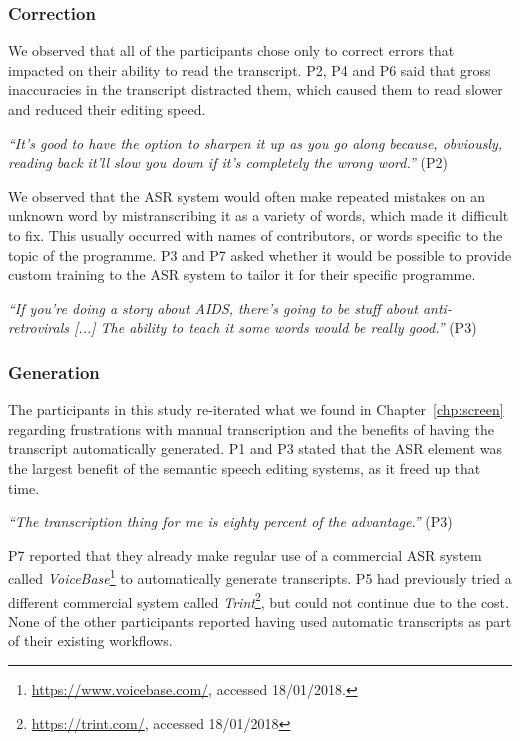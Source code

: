 \subsubsection{Correction}

We observed that all of the participants chose only to correct errors that impacted on their ability to
read the transcript.  P2, P4 and P6 said that gross inaccuracies in the transcript distracted them, which caused them
to read slower and reduced their editing speed.

\textit{``It's good to have the option to sharpen it up as you go along because, obviously, reading back it'll slow
you down if it's completely the wrong word.''} (P2)


We observed that the ASR system would often make repeated mistakes on an unknown word by mistranscribing it
as a variety of words, which made it difficult to fix.  This usually occurred with names of contributors, or words
specific to the topic of the programme.  P3 and P7 asked whether it would be possible to provide custom training to the
ASR system to tailor it for their specific programme.

\textit{``If you're doing a story about AIDS, there's going to be stuff about anti-retrovirals [...]
The ability to teach it some words would be really good.''} (P3)


\subsubsection{Generation}

The participants in this study re-iterated what we found in Chapter~\ref{chp:screen} regarding frustrations with manual
transcription and the benefits of having the transcript automatically generated.
P1 and P3 stated that the ASR element was the largest benefit of the semantic speech editing systems, as it
freed up that time.

\textit{``The transcription thing for me is eighty percent of the advantage.''} (P3)

P7 reported that they already make regular use of a commercial ASR system called
\textit{VoiceBase}\footnote{\url{https://www.voicebase.com/}, accessed 18/01/2018.} to automatically generate
transcripts.  P5 had previously tried a different commercial system called
\textit{Trint}\footnote{\url{https://trint.com/}, accessed 18/01/2018}, but could not continue due to the cost. None of
the other participants reported having used automatic transcripts as part of their existing workflows.

